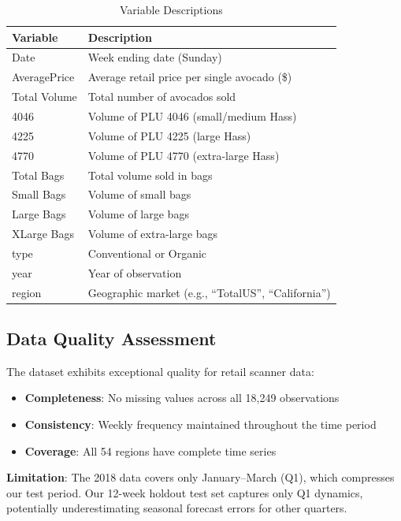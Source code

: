 \documentclass[12pt]{article}
\begin{document}
\begin{table}[H]
\centering
\caption{Variable Descriptions}
\begin{tabular}{p{3.5cm}p{9cm}}
\toprule
\textbf{Variable} & \textbf{Description} \\
\midrule
Date & Week ending date (Sunday) \\
AveragePrice & Average retail price per single avocado (\$) \\
Total Volume & Total number of avocados sold \\
4046 & Volume of PLU 4046 (small/medium Hass) \\
4225 & Volume of PLU 4225 (large Hass) \\
4770 & Volume of PLU 4770 (extra-large Hass) \\
Total Bags & Total volume sold in bags \\
Small Bags & Volume of small bags \\
Large Bags & Volume of large bags \\
XLarge Bags & Volume of extra-large bags \\
type & Conventional or Organic \\
year & Year of observation \\
region & Geographic market (e.g., ``TotalUS'', ``California'') \\
\bottomrule
\end{tabular}
\end{table}

\subsection{Data Quality Assessment}

The dataset exhibits exceptional quality for retail scanner data:

\begin{itemize}
    \item \textbf{Completeness}: No missing values across all 18,249 observations
    \item \textbf{Consistency}: Weekly frequency maintained throughout the time period
    \item \textbf{Coverage}: All 54 regions have complete time series
\end{itemize}

\textbf{Limitation}: The 2018 data covers only January--March (Q1), which compresses our test period. Our 12-week holdout test set captures only Q1 dynamics, potentially underestimating seasonal forecast errors for other quarters.
\end{document}
